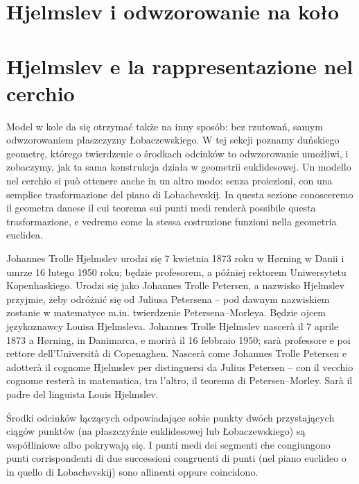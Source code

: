 
\section{Hjelmslev i odwzorowanie na koło} %
\section{Hjelmslev e la rappresentazione nel cerchio} %
\label{sekcja_hjelmslev}

Model w kole da się otrzymać także na inny sposób: bez rzutowań, samym odwzorowaniem płaszczyzny Łobaczewskiego. %
W tej sekcji poznamy duńskiego geometrę, którego twierdzenie o środkach odcinków to odwzorowanie umożliwi, i zobaczymy, jak ta sama konstrukcja działa w geometrii euklidesowej. %
Un modello nel cerchio si può ottenere anche in un altro modo: senza proiezioni, con una semplice trasformazione del piano di Lobachevskij. %
In questa sezione conosceremo il geometra danese il cui teorema sui punti medi renderà possibile questa trasformazione, e vedremo come la stessa costruzione funzioni nella geometria euclidea. %

Johannes Trolle Hjelmslev urodzi się 7 kwietnia 1873 roku w Hørning w Danii i umrze 16 lutego 1950 roku; będzie profesorem, a później rektorem Uniwersytetu Kopenhaskiego. %
Urodzi się jako Johannes Trolle Petersen, a nazwisko Hjelmslev przyjmie, żeby odróżnić się od Juliusa Petersena -- pod dawnym nazwiskiem zostanie w matematyce m.in. twierdzenie Petersena--Morleya. %
Będzie ojcem językoznawcy Louisa Hjelmsleva. %
Johannes Trolle Hjelmslev nascerà il 7 aprile 1873 a Hørning, in Danimarca, e morirà il 16 febbraio 1950; sarà professore e poi rettore dell'Università di Copenaghen. %
Nascerà come Johannes Trolle Petersen e adotterà il cognome Hjelmslev per distinguersi da Julius Petersen -- con il vecchio cognome resterà in matematica, tra l'altro, il teorema di Petersen--Morley. %
Sarà il padre del linguista Louis Hjelmslev. %
%
%

\begin{theorem}
[Hjelmsleva] %
[di Hjelmslev] %
	Środki odcinków łączących odpowiadające sobie punkty dwóch przystających ciągów punktów (na płaszczyźnie euklidesowej lub Łobaczewskiego) są współliniowe albo pokrywają się. %
	I punti medi dei segmenti che congiungono punti corrispondenti di due successioni congruenti di punti (nel piano euclideo o in quello di Lobachevskij) sono allineati oppure coincidono. %
\end{theorem}

